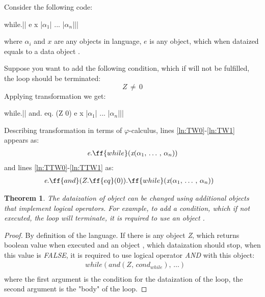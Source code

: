 \documentclass[sigplan,review,11pt,nonacm,natbib=false]{acmart}
\theoremstyle{theorems}
\newtheorem{eotheorem}{Theorem}
\begin{document}
    Consider the following code:
    \begin{ffcode}
        while.|$\label{ln:TW0}$|
        e
        x
        |$\alpha_1$|
        ...
        |$\alpha_n$||$\label{ln:TW1}$|
    \end{ffcode}
    where $\alpha_i$ and $x$ are any objects in language, $e$ is any object, which when dataized equals to a data object .

    Suppose you want to add the following condition, which if will not be fulfilled, the loop should be terminated:
    \begin{equation}
        Z\,\neq\,0
    \end{equation}
    Applying transformation we get:
    \begin{ffcode}
        while.|$\label{ln:TTW0}$|
        and.
        eq. (Z 0)
        e
        x
        |$\alpha_1$|
        ...
        |$\alpha_n$||$\label{ln:TTW1}$|
    \end{ffcode}

    Describing transformation in terms of $\varphi$-calculus, lines \ref{ln:TW0}-\ref{ln:TW1} appears as:
    \begin{equation}
        \begin{split}
            & \emph{e}.\ff{while}(\emph{x}(\alpha_1,\,\ldots\,,\,\alpha_n)) \\
        \end{split}
    \end{equation}
    and lines \ref{ln:TTW0}-\ref{ln:TTW1} as:
    \begin{equation}
        \begin{split}
            & \emph{e}.\ff{and}(Z.\ff{eq}(0)).\ff{while}(\emph{x}(\alpha_1,\,\ldots\,,\,\alpha_n))
        \end{split}
    \end{equation}

    \begin{eotheorem}
        The dataization of object  can be changed using additional objects that implement logical operators.
        For example, to add a condition, which if not executed, the loop will terminate, it is required to use an object .
    \end{eotheorem}

    \begin{proof}
        By definition of the language.
        If there is any object \emph{Z}, which returns boolean value when executed and an object , which dataization should stop, when this value is \emph{FALSE}, it is required to use logical operator \emph{AND} with this object:
        \begin{equation}
            \begin{split}
                & while(and(Z,\,cond_{while}),\,\ldots)\\
            \end{split}
        \end{equation}
        where the first argument is the condition for the dataization of the loop, the second argument is the "body" of the loop.
    \end{proof}
\end{document}
